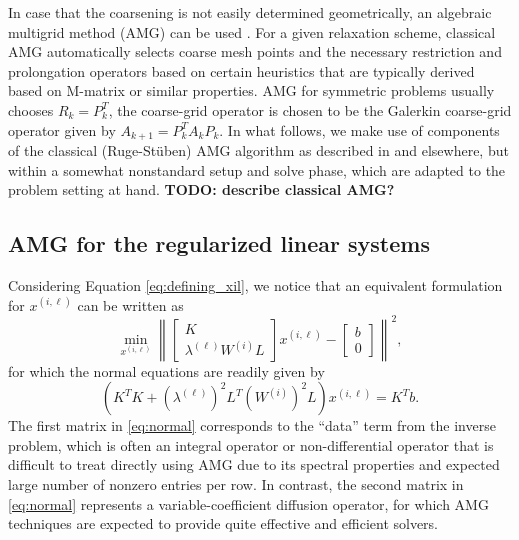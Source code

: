 In case that the coarsening is not easily determined geometrically, an
algebraic multigrid method (AMG) can be
used \cite{ABrandt_SFMcCormick_JWRuge_1984a, JWRuge_KStuben_1987a,
KStuben_2001a}. For a given relaxation scheme, classical AMG
automatically selects coarse mesh points and the necessary restriction
and prolongation operators based on certain heuristics that are
typically derived based on M-matrix or similar properties. AMG for
symmetric problems usually chooses $R_k = P_k^T$, the coarse-grid
operator is chosen to be the Galerkin coarse-grid operator given by
$A_{k+1} = P_k^T A_k P_k$.  In what follows, we make use of components
of the classical (Ruge-St\"uben) AMG algorithm as described
in \cite{JWRuge_KStuben_1987a} and elsewhere, but within a somewhat
nonstandard setup and solve phase, which are adapted to the problem
setting at hand.  {\bf TODO: describe classical AMG?}

\subsection{AMG for the regularized linear systems}

Considering Equation \eqref{eq:defining_xil}, we notice that an
equivalent formulation for $x^{(i,\ell)}$ can be written as
\begin{equation}
\label{eq:block-ls}
\min_{x^{(i,\ell)}}\left\| \left[\begin{array}{c} K \\ \lambda^{(\ell)}
                           W^{(i)}L\end{array}\right]x^{(i,\ell)} - \left[\begin{array}{c} b \\ 0 \end{array}\right]\right\|^2,
\end{equation}
for which the normal equations are readily given by
\begin{equation}
\label{eq:normal}
\left(K^TK + \left(\lambda^{(\ell)}\right)^2 L^T\left(W^{(i)}\right)^2L\right)x^{(i,\ell)} = K^Tb.
\end{equation}
The first matrix in \eqref{eq:normal} corresponds to the ``data'' term
from the inverse problem, which is often an integral operator or
non-differential operator that is difficult to treat directly using
AMG due to its spectral properties and expected large number of
nonzero entries per row.  In contrast, the second matrix
in \eqref{eq:normal} represents a variable-coefficient diffusion
operator, for which AMG techniques are expected to provide quite
effective and efficient solvers.

